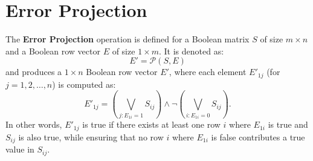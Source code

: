 \documentclass{article}
\begin{document}
\section{Error Projection}
The \textbf{Error Projection} operation is defined for a Boolean matrix \( S \) of size \( m \times n \) and a Boolean row vector \( E \) of size \( 1 \times m \). It is denoted as:
\[
E' = \mathcal{P}(S, E)
\]
and produces a \( 1 \times n \) Boolean row vector \( E' \), where each element \( E'_{1j} \) (for \( j = 1, 2, \dots, n \)) is computed as:
\[
E'_{1j} = \left( \bigvee_{j: E_{1i} = 1} S_{ij} \right) \wedge \neg \left( \bigvee_{i: E_{1i} = 0} S_{ij} \right).
\]
In other words, \( E'_{1j} \) is true if there exists at least one row \( i \) where \( E_{1i} \) is true and \( S_{ij} \) is also true, while ensuring that no row \( i \) where \( E_{1i} \) is false contributes a true value in \( S_{ij} \).
\end{document}
